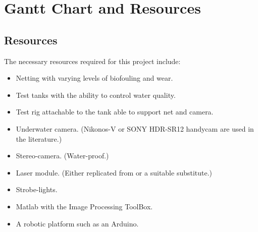\documentclass[11.5pt, twoside, a4paper]{article}
\begin{document}
\section{Gantt Chart and Resources}

\subsection{Resources}

The necessary resources required for this project include:
\begin{itemize}
\item Netting with varying levels of biofouling and wear.
\item Test tanks with the ability to control water quality.
\item Test rig attachable to the tank able to support net and camera.
\item Underwater camera. (Nikonos-V or  SONY HDR-SR12 handycam are used in the literature.)
\item Stereo-camera. (Water-proof.)
\item Laser module. (Either replicated from \cite{jakobsen2011automatic} or a suitable substitute.)
\item Strobe-lights.
\item Matlab with the Image Processing ToolBox.
\item A robotic platform such as an Arduino.
\end{itemize}
\end{document}
